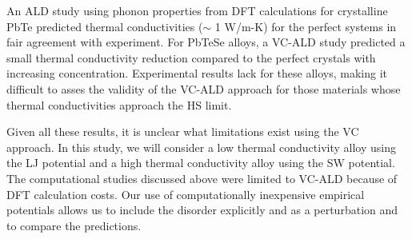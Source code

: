 \documentclass[aps,prb,onecolumn,preprint,footinbib,superscriptaddress,amsmath,amssymb,floatfix]{revtex4}
\begin{document}
An ALD study using phonon properties from DFT calculations for 
crystalline PbTe\cite{shiga_microscopic_2012} predicted 
thermal conductivities ($\sim$ 1 W/m-K) for the perfect systems 
in fair agreement with experiment. For PbTeSe alloys, a VC-ALD 
study predicted a small thermal conductivity reduction compared to the 
perfect crystals with increasing 
concentration.\cite{tian_phonon_2012} Experimental results lack for 
these alloys,\cite{kudman_thermoelectric_1972,pei_convergence_2011} 
making it difficult to asses the validity of the VC-ALD approach for 
those materials whose thermal conductivities approach the HS limit.
\cite{koh_lattice_2009} 

Given all these results, it is unclear what limitations exist 
using the VC approach. 
In this study, we will consider a low thermal conductivity alloy  
using the LJ potential and a high thermal conductivity alloy using the 
SW potential. The computational studies discussed above were 
limited to VC-ALD 
because of DFT calculation costs. Our use of computationally 
inexpensive empirical potentials allows us to include the disorder 
explicitly and as a perturbation and to compare the predictions. 


\end{document}
